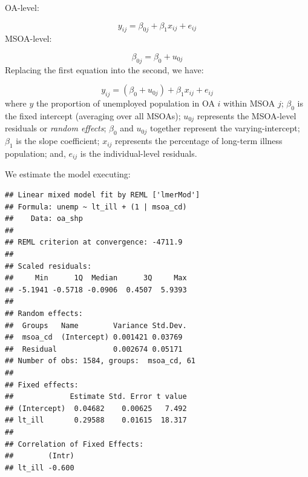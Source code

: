 \documentclass[]{book}
\newenvironment{Shaded}{\begin{snugshade}}{\end{snugshade}}
\newcommand{\KeywordTok}[1]{\textcolor[rgb]{0.13,0.29,0.53}{\textbf{#1}}}
\newcommand{\DataTypeTok}[1]{\textcolor[rgb]{0.13,0.29,0.53}{#1}}
\newcommand{\DecValTok}[1]{\textcolor[rgb]{0.00,0.00,0.81}{#1}}
\newcommand{\StringTok}[1]{\textcolor[rgb]{0.31,0.60,0.02}{#1}}
\newcommand{\CommentTok}[1]{\textcolor[rgb]{0.56,0.35,0.01}{\textit{#1}}}
\newcommand{\OperatorTok}[1]{\textcolor[rgb]{0.81,0.36,0.00}{\textbf{#1}}}
\newcommand{\NormalTok}[1]{#1}
\begin{document}
OA-level:

\[y_{ij} = \beta_{0j} + \beta_{1}x_{ij} + e_{ij}\] MSOA-level:

\[\beta_{0j} = \beta_{0} + u_{0j}\] Replacing the first equation into
the second, we have:

\[y_{ij} = (\beta_{0} + u_{0j}) + \beta_{1}x_{ij} + e_{ij}\] where \(y\)
the proportion of unemployed population in OA \(i\) within MSOA \(j\);
\(\beta_{0}\) is the fixed intercept (averaging over all MSOAs);
\(u_{0j}\) represents the MSOA-level residuals or \emph{random effects};
\(\beta_{0}\) and \(u_{0j}\) together represent the varying-intercept;
\(\beta_{1}\) is the slope coefficient; \(x_{ij}\) represents the
percentage of long-term illness population; and, \(e_{ij}\) is the
individual-level residuals.

We estimate the model executing:

\begin{Shaded}
\end{Shaded}

\begin{verbatim}
## Linear mixed model fit by REML ['lmerMod']
## Formula: unemp ~ lt_ill + (1 | msoa_cd)
##    Data: oa_shp
## 
## REML criterion at convergence: -4711.9
## 
## Scaled residuals: 
##     Min      1Q  Median      3Q     Max 
## -5.1941 -0.5718 -0.0906  0.4507  5.9393 
## 
## Random effects:
##  Groups   Name        Variance Std.Dev.
##  msoa_cd  (Intercept) 0.001421 0.03769 
##  Residual             0.002674 0.05171 
## Number of obs: 1584, groups:  msoa_cd, 61
## 
## Fixed effects:
##             Estimate Std. Error t value
## (Intercept)  0.04682    0.00625   7.492
## lt_ill       0.29588    0.01615  18.317
## 
## Correlation of Fixed Effects:
##        (Intr)
## lt_ill -0.600
\end{verbatim}
\end{document}
